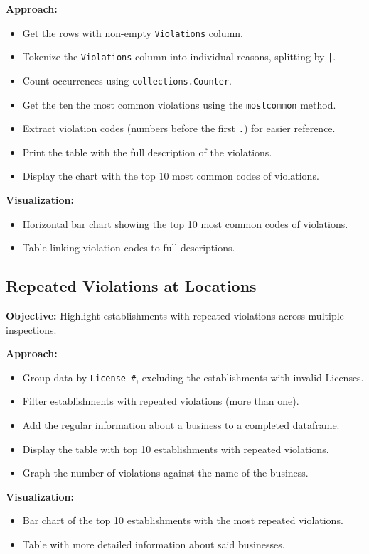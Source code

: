 \documentclass[12pt]{article}
\begin{document}
\textbf{Approach:}
\begin{itemize}
    \item Get the rows with non-empty \texttt{Violations} column.
    \item Tokenize the \texttt{Violations} column into individual reasons, splitting by \texttt{|}.
    \item Count occurrences using \texttt{collections.Counter}.
    \item Get the ten the most common violations using the \texttt{most\underline{\space}common} method.
    \item Extract violation codes (numbers before the first \texttt{.}) for easier reference.
    \item Print the table with the full description of the violations.
    \item Display the chart with the top 10 most common codes of violations.
\end{itemize}

\textbf{Visualization:}
\begin{itemize}
    \item Horizontal bar chart showing the top 10 most common codes of violations.
    \item Table linking violation codes to full descriptions.
\end{itemize}

\subsection*{Repeated Violations at Locations}
\textbf{Objective:} Highlight establishments with repeated violations across multiple inspections.

\textbf{Approach:}
\begin{itemize}
    \item Group data by \texttt{License \#}, excluding the establishments with invalid Licenses.
    \item Filter establishments with repeated violations (more than one).
    \item Add the regular information about a business to a completed dataframe.
    \item Display the table with top 10 establishments with repeated violations.
    \item Graph the number of violations against the name of the business.
\end{itemize}

\textbf{Visualization:}
\begin{itemize}
    \item Bar chart of the top 10 establishments with the most repeated violations.
    \item Table with more detailed information about said businesses.
\end{itemize}
\end{document}
